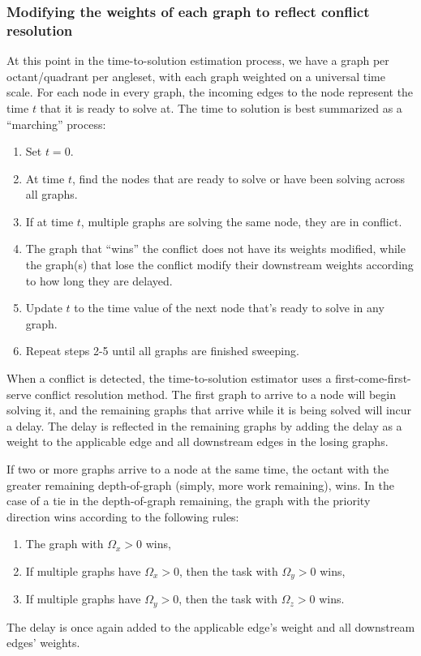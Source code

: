 \documentclass[times,final]{elsarticle}
\begin{document}
\subsubsection{Modifying the weights of each graph to reflect conflict resolution}\label{sec:conflict}

At this point in the time-to-solution estimation process, we have a graph per octant/quadrant per angleset, with each graph weighted on a universal time scale.
For each node in every graph, the incoming edges to the node represent the time $t$ that it is ready to solve at.
The time to solution is best summarized as a ``marching'' process:
    \begin{enumerate}
      \item Set $t = 0$.
      \item At time $t$, find the nodes that are ready to solve or have been solving across all graphs.
      \item If at time $t$, multiple graphs are solving the same node, they are in conflict.
      \item The graph that ``wins'' the conflict does not have its weights modified, while the graph(s) that lose the conflict modify their downstream weights according to how long they are delayed.
      \item Update $t$ to the time value of the next node that's ready to solve in any graph.
      \item Repeat steps 2-5 until all graphs are finished sweeping.
    \end{enumerate}

When a conflict is detected, the time-to-solution estimator uses a first-come-first-serve conflict resolution method.
The first graph to arrive to a node will begin solving it, and the remaining graphs that arrive while it is being solved will incur a delay.
The delay is reflected in the remaining graphs by adding the delay as a weight to the applicable edge and all downstream edges in the losing graphs.

If two or more graphs arrive to a node at the same time, the octant with the greater remaining depth-of-graph (simply, more work remaining), wins.
In the case of a tie in the depth-of-graph remaining, the graph with the priority direction wins according to the following rules:
\begin{enumerate}
    \item The graph with $\Omega_x > 0$ wins,
	\item If multiple graphs have $\Omega_x > 0$, then the task with $\Omega_y > 0$ wins,
	\item If multiple graphs have $\Omega_y > 0$, then the task with $\Omega_z > 0$ wins.
\end{enumerate}
The delay is once again added to the applicable edge's weight and all downstream edges' weights.
\end{document}
